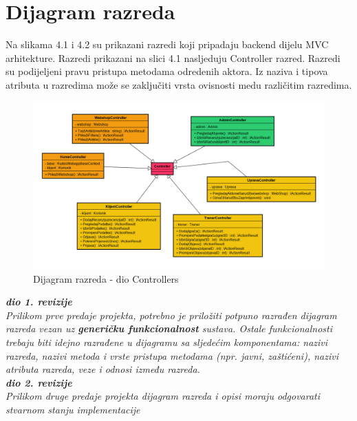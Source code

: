 			\eject
			
			
		\section{Dijagram razreda}
		
			\textnormal{Na slikama 4.1 i 4.2 su prikazani razredi koji pripadaju backend dijelu MVC arhitekture. Razredi prikazani na slici 4.1 nasljeduju Controller razred. Razredi su podijeljeni  pravu pristupa metodama odredenih aktora. Iz naziva i tipova atributa u razredima može se zaključiti vrsta ovisnosti medu različitim razredima.}\\
			
			\begin{figure}[H]
				\includegraphics[width=\linewidth]{dijagrami/DijagramRazredaController.png}
				\centering
				\caption{Dijagram razreda - dio Controllers}
				\label{fig:ClassDiagram1}
			\end{figure}
			
			\textbf{\textit{dio 1. revizije}}\\
			
			\textit{Prilikom prve predaje projekta, potrebno je priložiti potpuno razrađen dijagram razreda vezan uz \textbf{generičku funkcionalnost} sustava. Ostale funkcionalnosti trebaju biti idejno razrađene u dijagramu sa sljedećim komponentama: nazivi razreda, nazivi metoda i vrste pristupa metodama (npr. javni, zaštićeni), nazivi atributa razreda, veze i odnosi između razreda.}\\
			
			\textbf{\textit{dio 2. revizije}}\\			
			
			\textit{Prilikom druge predaje projekta dijagram razreda i opisi moraju odgovarati stvarnom stanju implementacije}
			
